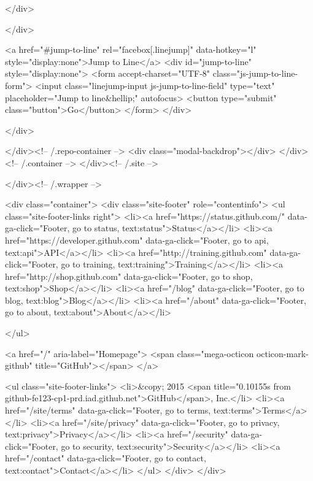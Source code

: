   </div>

</div>

<a href="#jump-to-line" rel="facebox[.linejump]" data-hotkey="l" style="display:none">Jump to Line</a>
<div id="jump-to-line" style="display:none">
  <form accept-charset="UTF-8" class="js-jump-to-line-form">
    <input class="linejump-input js-jump-to-line-field" type="text" placeholder="Jump to line&hellip;" autofocus>
    <button type="submit" class="button">Go</button>
  </form>
</div>

        </div>

      </div><!-- /.repo-container -->
      <div class="modal-backdrop"></div>
    </div><!-- /.container -->
  </div><!-- /.site -->


    </div><!-- /.wrapper -->

      <div class="container">
  <div class="site-footer" role="contentinfo">
    <ul class="site-footer-links right">
        <li><a href="https://status.github.com/" data-ga-click="Footer, go to status, text:status">Status</a></li>
      <li><a href="https://developer.github.com" data-ga-click="Footer, go to api, text:api">API</a></li>
      <li><a href="http://training.github.com" data-ga-click="Footer, go to training, text:training">Training</a></li>
      <li><a href="http://shop.github.com" data-ga-click="Footer, go to shop, text:shop">Shop</a></li>
        <li><a href="/blog" data-ga-click="Footer, go to blog, text:blog">Blog</a></li>
        <li><a href="/about" data-ga-click="Footer, go to about, text:about">About</a></li>

    </ul>

    <a href="/" aria-label="Homepage">
      <span class="mega-octicon octicon-mark-github" title="GitHub"></span>
    </a>

    <ul class="site-footer-links">
      <li>&copy; 2015 <span title="0.10155s from github-fe123-cp1-prd.iad.github.net">GitHub</span>, Inc.</li>
        <li><a href="/site/terms" data-ga-click="Footer, go to terms, text:terms">Terms</a></li>
        <li><a href="/site/privacy" data-ga-click="Footer, go to privacy, text:privacy">Privacy</a></li>
        <li><a href="/security" data-ga-click="Footer, go to security, text:security">Security</a></li>
        <li><a href="/contact" data-ga-click="Footer, go to contact, text:contact">Contact</a></li>
    </ul>
  </div>
</div>


